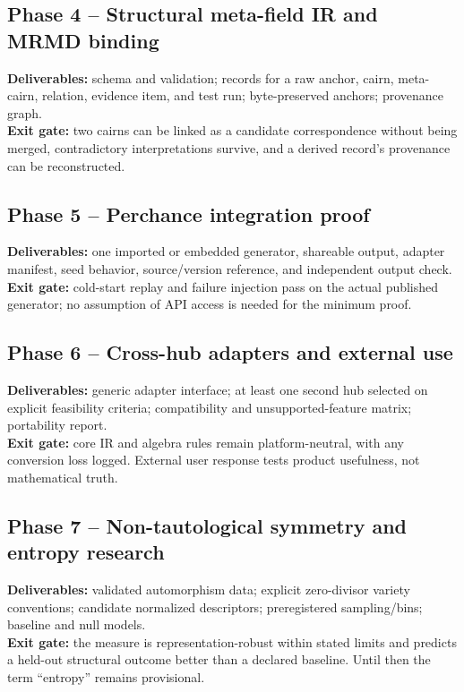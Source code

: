 \documentclass[11pt,oneside]{article}
\begin{document}
\subsection{Phase 4 -- Structural meta-field IR and MRMD binding}
\textbf{Deliverables:} schema and validation; records for a raw anchor, cairn, meta-cairn, relation, evidence item, and test run; byte-preserved anchors; provenance graph.\\
\textbf{Exit gate:} two cairns can be linked as a candidate correspondence without being merged, contradictory interpretations survive, and a derived record's provenance can be reconstructed.

\subsection{Phase 5 -- Perchance integration proof}
\textbf{Deliverables:} one imported or embedded generator, shareable output, adapter manifest, seed behavior, source/version reference, and independent output check.\\
\textbf{Exit gate:} cold-start replay and failure injection pass on the actual published generator; no assumption of API access is needed for the minimum proof.

\subsection{Phase 6 -- Cross-hub adapters and external use}
\textbf{Deliverables:} generic adapter interface; at least one second hub selected on explicit feasibility criteria; compatibility and unsupported-feature matrix; portability report.\\
\textbf{Exit gate:} core IR and algebra rules remain platform-neutral, with any conversion loss logged. External user response tests product usefulness, not mathematical truth.

\subsection{Phase 7 -- Non-tautological symmetry and entropy research}
\textbf{Deliverables:} validated automorphism data; explicit zero-divisor variety conventions; candidate normalized descriptors; preregistered sampling/bins; baseline and null models.\\
\textbf{Exit gate:} the measure is representation-robust within stated limits and predicts a held-out structural outcome better than a declared baseline. Until then the term ``entropy'' remains provisional.
\end{document}
